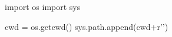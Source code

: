 

\graphicspath{{./../img/}}

\begin{pycode}
    import os
    import sys
    
    cwd = os.getcwd()
    sys.path.append(cwd+r'\src')
\end{pycode}


    
    


